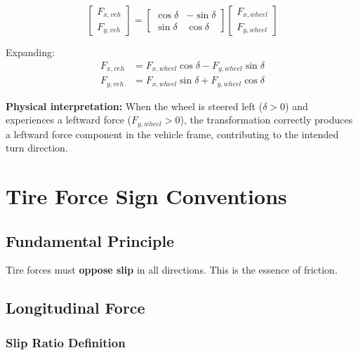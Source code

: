 \documentclass[11pt,a4paper]{article}
\begin{document}
\begin{equation}
\begin{bmatrix} F_{x,veh} \\ F_{y,veh} \end{bmatrix} = \begin{bmatrix} \cos\delta & -\sin\delta \\ \sin\delta & \cos\delta \end{bmatrix} \begin{bmatrix} F_{x,wheel} \\ F_{y,wheel} \end{bmatrix}
\label{eq:rotation_matrix}
\end{equation}

Expanding:
\begin{align}
F_{x,veh} &= F_{x,wheel} \cos\delta - F_{y,wheel} \sin\delta \\
F_{y,veh} &= F_{x,wheel} \sin\delta + F_{y,wheel} \cos\delta
\end{align}

\textbf{Physical interpretation:} When the wheel is steered left ($\delta > 0$) and experiences a leftward force ($F_{y,wheel} > 0$), the transformation correctly produces a leftward force component in the vehicle frame, contributing to the intended turn direction.

\section{Tire Force Sign Conventions}

\subsection{Fundamental Principle}

Tire forces must \textbf{oppose slip} in all directions. This is the essence of friction.

\subsection{Longitudinal Force}

\subsubsection{Slip Ratio Definition}
\end{document}
